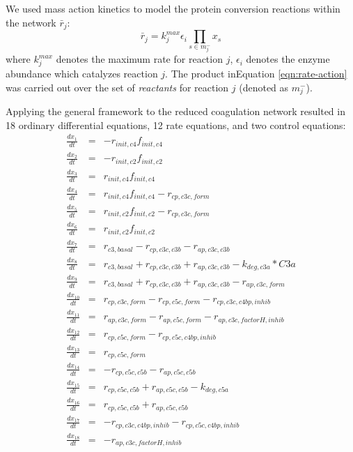 \documentclass[12pt]{article}
\begin{document}
We used mass action kinetics to model the protein conversion reactions within the network $\bar{r}_{j}$:
\begin{equation}\label{eqn:rate-action}
	\bar{r}_{j} = k_{j}^{max}\epsilon_{i}\prod_{s\in{m_{j}^{-}}}x_{s}
\end{equation}
where $k_{j}^{max}$ denotes the maximum rate for reaction $j$, $\epsilon_{i}$ denotes the enzyme abundance which catalyzes reaction $j$. The product in\linebreak Equation \eqref{eqn:rate-action} was carried out over the set of \textit{reactants} for reaction $j$ (denoted as $m_{j}^{-}$).

Applying the general framework to the reduced coagulation network resulted in 18 ordinary differential equations, 12 rate equations, and two control equations:
\begin{eqnarray}
	\frac{dx_{1}}{dt} & =& - r_{init,c4}f_{init,c4} \\ 								%
	\frac{dx_{2}}{dt} &=& - r_{init,c2}f_{init,c2} \\  								%
	\frac{dx_{3}}{dt} &=&  r_{init,c4}f_{init,c4} \\ 								%
	\frac{dx_{4}}{dt} &=& r_{init,c4}f_{init,c4} - r_{cp,c3c,form} \\ 					%
	\frac{dx_{5}}{dt} & = & r_{init,c2}f_{init,c2} - r_{cp,c3c,form} \\ 					%
	\frac{dx_{6}}{dt} &=& r_{init,c2}f_{init,c2} \\ 								%
	\frac{dx_{7}}{dt} &=& r_{c3,basal} - r_{cp,c3c,c3b} - r_{ap,c3c,c3b}\\ 				%
	\frac{dx_{8}}{dt} &=& r_{c3,basal}  + r_{cp,c3c,c3b} + r_{ap,c3c,c3b}  - k_{deg,c3a}*C3a \\		%
	\frac{dx_{9}}{dt} &=& r_{c3,basal}  + r_{cp,c3c,c3b} + r_{ap,c3c,c3b}  -  r_{ap,c3c,form} \\		%
	\frac{dx_{10}}{dt} &=& r_{cp,c3c,form} - r_{cp,c5c,form} -  r_{cp,c3c,c4bp,inhib} \\			%
	\frac{dx_{11}}{dt} &=& r_{ap,c3c,form} - r_{ap,c5c,form} -  r_{ap,c3c,factorH,inhib} \\			%
	\frac{dx_{12}}{dt} &=& r_{cp,c5c,form} - r_{cp,c5c,c4bp,inhib} \\							%
	\frac{dx_{13}}{dt} &=& r_{cp,c5c,form}  \\											%
	\frac{dx_{14}}{dt} &=& - r_{cp,c5c,c5b} - r_{ap,c5c,c5b} \\								%
	\frac{dx_{15}}{dt} &=&  r_{cp,c5c,c5b} + r_{ap,c5c,c5b} - k_{deg,c5a} \\					%
	\frac{dx_{16}}{dt} &=& r_{cp,c5c,c5b} + r_{ap,c5c,c5b} \\								%
	\frac{dx_{17}}{dt} &=& - r_{cp,c3c,c4bp,inhib} - r_{cp,c5c,c4bp,inhib} \\  				         %
	\frac{dx_{18}}{dt} &=& - r_{ap,c3c,factorH,inhib} \\									%
\end{eqnarray}
\end{document}
